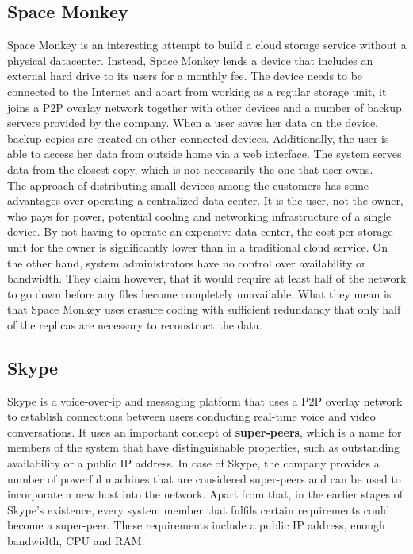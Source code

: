 \documentclass{pracamgren}
\begin{document}
\subsection{Space Monkey}

Space Monkey \cite{space_monkey} is an interesting attempt to build a cloud storage service without a physical datacenter. Instead, Space Monkey lends a device that includes an external hard drive to its users for a monthly fee. The device needs to be connected to the Internet and apart from working as a regular storage unit, it joins a P2P overlay network together with other devices and a number of backup servers provided by the company. When a user saves her data on the device, backup copies are created on other connected devices. Additionally, the user is able to access her data from outside home via a web interface. The system serves data from the closest copy, which is not necessarily the one that user owns.\\

The approach of distributing small devices among the customers has some advantages over operating a centralized data center. It is the user, not the owner, who pays for power, potential cooling and networking infrastructure of a single device. By not having to operate an expensive data center, the cost per storage unit for the owner is significantly lower than in a traditional cloud service. On the other hand, system administrators have no control over availability or bandwidth. They claim however, that it would require at least half of the network to go down before any files become completely unavailable. What they mean is that Space Monkey uses erasure coding with sufficient redundancy that only half of the replicas are necessary to reconstruct the data.\\

\subsection{Skype}

Skype \cite{skype} is a voice-over-ip and messaging platform that uses a P2P overlay network to establish connections between users conducting real-time voice and video conversations. It uses an important concept of {\bf super-peers}, which is a name for members of the system that have distinguishable properties, such as outstanding availability or a public IP address. In case of Skype, the company provides a number of powerful machines that are considered super-peers and can be used to incorporate a new host into the network. Apart from that, in the earlier stages of Skype's existence, every system member that fulfils certain requirements could become a super-peer. These requirements include a public IP address, enough bandwidth, CPU and RAM.\\
\end{document}
